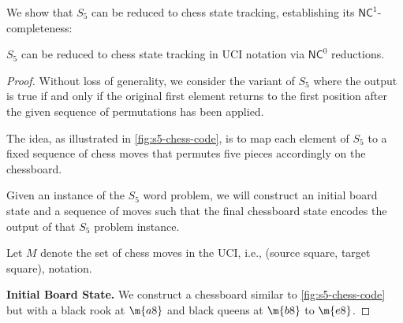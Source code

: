  

We show that $S_5$ can be reduced to chess state tracking, establishing its $\mathsf{NC}^1$-completeness:

\begin{proposition}\label{prop:chess}
    $S_5$ can be reduced to chess state tracking in UCI notation via $\mathsf{NC}^0$ reductions.
\end{proposition}

\begin{proof}
    Without loss of generality, we consider the variant of $S_5$ where the output is true if and only if the original first element returns to the first position after the given sequence of permutations has been applied.

    The idea, as illustrated in \ref{fig:s5-chess-code}, is to map each element of $S_5$ to a fixed sequence of chess moves that permutes five pieces accordingly on the chessboard.

    Given an instance of the $S_5$ word problem, we will construct an initial board state and a sequence of moves such that the final chessboard state encodes the output of that $S_5$ problem instance.

    Let $M$ denote the set of chess moves in the UCI, i.e., (source square, target square), notation.

     \textbf{Initial Board State.} We construct a chessboard similar to \ref{fig:s5-chess-code} but with a black rook at $\m{a8}$ and black queens at $\m{b8}$ to $\m{e8}$.


\end{proof}
